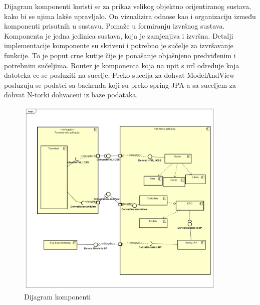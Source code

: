 Dijagram komponenti koristi se za prikaz velikog objektno orijentiranog sustava, kako bi se njima lakše upravljalo. 
On vizualizira odnose kao i organizaciju između komponenti prisutnih u sustavu.
Pomaže u formiranju izvršnog sustava. Komponenta je jedna jedinica sustava, koja je zamjenjiva i izvršna.
 Detalji implementacije komponente su skriveni i potrebno je sučelje za izvršavanje funkcije. 
 To je poput crne kutije čije je ponašanje objašnjeno predviđenim i potrebnim sučeljima.
 Router je komponenta koja na upit s url odreduje koja datoteka ce se posluziti na sucelje. 
 Preko sucelja za dohvat ModelAndView posluzuju se podatci sa backenda koji su preko spring JPA-a sa suceljem za dohvat N-torki dohvaceni iz baze podataka.
 \begin{figure}[H]
 	
 	\includegraphics[width=0.9\textwidth]{slike/DijagramKomponenti.png} %
 	\centering
 	\caption{Dijagram komponenti}
 	\label{fig:dijakomp}
 \end{figure}
 